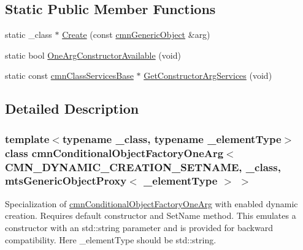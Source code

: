 \subsection*{Static Public Member Functions}
\begin{DoxyCompactItemize}
\item 
static \+\_\+class $\ast$ \hyperlink{classcmn_conditional_object_factory_one_arg_3_01_c_m_n___d_y_n_a_m_i_c___c_r_e_a_t_i_o_n___s_e_tb8b7ba29a3cb16408b71ff50b31fc6ff_af6a477d901a11afc0209da55db37c212}{Create} (const \hyperlink{classcmn_generic_object}{cmn\+Generic\+Object} \&arg)
\item 
static bool \hyperlink{classcmn_conditional_object_factory_one_arg_3_01_c_m_n___d_y_n_a_m_i_c___c_r_e_a_t_i_o_n___s_e_tb8b7ba29a3cb16408b71ff50b31fc6ff_a33480011f4877633d1dbffb476567a11}{One\+Arg\+Constructor\+Available} (void)
\item 
static const \hyperlink{classcmn_class_services_base}{cmn\+Class\+Services\+Base} $\ast$ \hyperlink{classcmn_conditional_object_factory_one_arg_3_01_c_m_n___d_y_n_a_m_i_c___c_r_e_a_t_i_o_n___s_e_tb8b7ba29a3cb16408b71ff50b31fc6ff_a7baf137ad43baf443140dde41653d69e}{Get\+Constructor\+Arg\+Services} (void)
\end{DoxyCompactItemize}


\subsection{Detailed Description}
\subsubsection*{template$<$typename \+\_\+class, typename \+\_\+element\+Type$>$class cmn\+Conditional\+Object\+Factory\+One\+Arg$<$ C\+M\+N\+\_\+\+D\+Y\+N\+A\+M\+I\+C\+\_\+\+C\+R\+E\+A\+T\+I\+O\+N\+\_\+\+S\+E\+T\+N\+A\+M\+E, \+\_\+class, mts\+Generic\+Object\+Proxy$<$ \+\_\+element\+Type $>$ $>$}

Specialization of \hyperlink{classcmn_conditional_object_factory_one_arg}{cmn\+Conditional\+Object\+Factory\+One\+Arg} with enabled dynamic creation. Requires default constructor and Set\+Name method. This emulates a constructor with an std\+::string parameter and is provided for backward compatibility. Here \+\_\+element\+Type should be std\+::string. 

